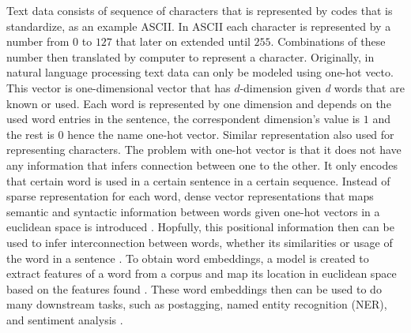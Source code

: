     Text data consists of sequence of characters that is represented
    by codes that is standardize, as an example ASCII. In ASCII each
    character is represented by a number from $0$ to $127$ that later
    on extended until $255$. Combinations of these number then
    translated by computer to represent a character. Originally, in
    natural language processing text data can only be modeled using
    one-hot vecto. This vector is one-dimensional vector that has
    $d$-dimension given \textit{d} words that are known or used. Each
    word is represented by one dimension and depends on the used word
    entries in the sentence, the correspondent dimension's value is
    $1$ and the rest is $0$ hence the name one-hot vector. Similar
    representation also used for representing characters. The problem
    with one-hot vector is that it does not have any information that
    infers connection between one to the other. It only encodes that
    certain word is used in a certain sentence in a certain sequence.
    Instead of sparse representation for each word, dense vector
    representations that maps semantic and syntactic information
    between words given one-hot vectors in a euclidean space is
    introduced \citep{wordembedding2017yang, Distributed2013mikolov}.
    Hopfully, this positional information then can be used to infer
    interconnection between words, whether its similarities or usage
    of the word in a sentence \citep{distributional1954harris}. To
    obtain word embeddings, a model is created to extract features of
    a word from a corpus and map its location in euclidean space based
    on the features found \citep{Distributed2013mikolov,
    polyglot2013alrfou, dict2vect2017tissier}. These word embeddings
    then can be used to do many downstream tasks, such as postagging,
    named entity recognition (NER), and sentiment analysis
    \citep{finding2015ling, neural2016lample}. 
    
